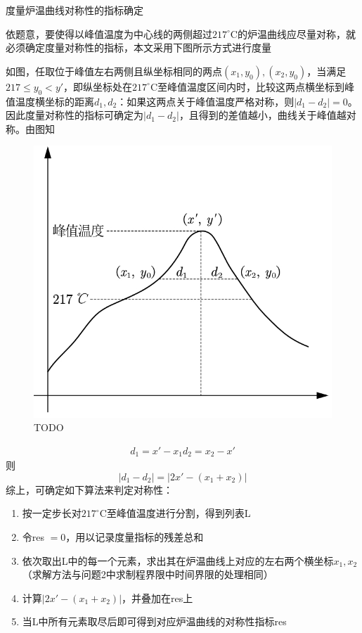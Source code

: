 \documentclass[../main.tex]{subfiles}
\begin{document}
度量炉温曲线对称性的指标确定

依题意，要使得以峰值温度为中心线的两侧超过\(217^{\circ}\mathrm{C}\)的炉温曲线应尽量对称，就必须确定度量对称性的指标，本文采用下图所示方式进行度量

如图，任取位于峰值左右两侧且纵坐标相同的两点\((x_1,y_0 ),(x_2,y_0 )\)，当满足\(217≤y_0<y′\)，即纵坐标处在\(217^{\circ}\mathrm{C}\)至峰值温度区间内时，比较这两点横坐标到峰值温度横坐标的距离\(d_1,d_2\)：如果这两点关于峰值温度严格对称，则\(\vert d_1−d_2 \vert =0\)。因此度量对称性的指标可确定为\(\vert d_1−d_2 \vert\)，且得到的差值越小，曲线关于峰值越对称。由图知

\begin{figure}[H]
				\centering
				\includegraphics[scale = 0.4]{lu_symmetric.jpg}
				\caption{TODO}\label{fig:lu_symmetric}
\end{figure}

\[
\begin{aligned}
d_1=x′−x_1
d_2=x_2−x′
\end{aligned}
\]
则
\begin{equation}
\vert d_1−d_2 \vert =\vert 2x′−(x_1+x_2 )\vert
\end{equation}
综上，可确定如下算法来判定对称性：
\begin{enumerate}
\item  按一定步长对\(217^{\circ}\mathrm{C}\)至峰值温度进行分割，得到列表L
\item  令res \({} = 0\)，用以记录度量指标的残差总和
\item  依次取出L中的每一个元素，求出其在炉温曲线上对应的左右两个横坐标\(x_1,x_2\) （求解方法与问题2中求制程界限中时间界限的处理相同）
\item  计算\(\vert 2x'−(x_1+x_2 )\vert\)，并叠加在res上
\item  当L中所有元素取尽后即可得到对应炉温曲线的对称性指标res
\end{enumerate}
\end{document}
